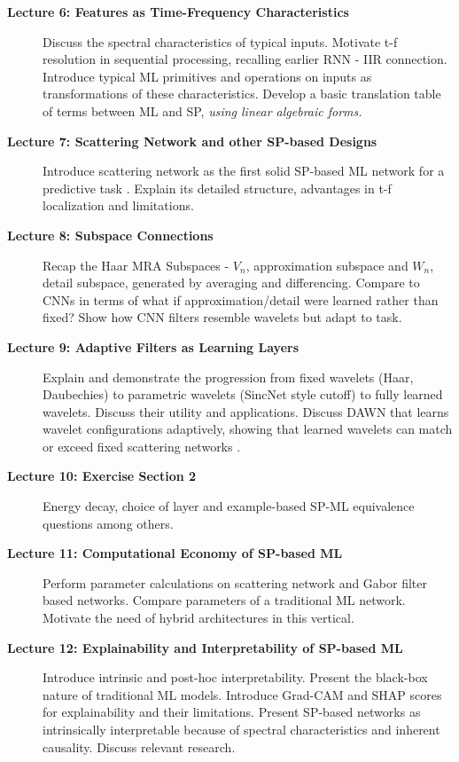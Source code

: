 \documentclass[12pt]{article}
\begin{document}
\begin{description}
    \item[\textbf{Lecture 6: Features as Time-Frequency Characteristics}] 
    Discuss the spectral characteristics of typical inputs. Motivate t-f resolution in sequential processing, recalling earlier RNN - IIR connection. Introduce typical ML primitives and operations on inputs as transformations of these characteristics. Develop a basic translation table of terms between ML and SP, \textit{using linear algebraic forms.}

    \item[\textbf{Lecture 7: Scattering Network and other SP-based Designs}]
    Introduce scattering network as the first solid SP-based ML network for a predictive task \cite{3}. Explain its detailed structure, advantages in t-f localization and limitations.

    \item[\textbf{Lecture 8: Subspace Connections}] 
    Recap the Haar MRA Subspaces - $V_n$, approximation subspace and $W_n$, detail subspace, generated by averaging and differencing. Compare to CNNs in terms of what if approximation/detail were learned rather than fixed? Show how CNN filters resemble wavelets but adapt to task. 

    \item[\textbf{Lecture 9: Adaptive Filters as Learning Layers}] 
    Explain and demonstrate the progression from fixed wavelets (Haar, Daubechies) to parametric wavelets (SincNet style cutoff) to fully learned wavelets. Discuss their utility and applications. Discuss DAWN \cite{4} that learns wavelet configurations adaptively, showing that learned wavelets can match or exceed fixed scattering networks \cite{5}.

    \item[\textbf{Lecture 10: Exercise Section 2}] 
    Energy decay, choice of layer and example-based SP-ML equivalence questions among others. 

    \item[\textbf{Lecture 11: Computational Economy of SP-based ML}] 
    Perform parameter calculations on scattering network and Gabor filter based networks. Compare parameters of a traditional ML network. Motivate the need of hybrid architectures in this vertical.

    \item[\textbf{Lecture 12: Explainability and Interpretability of SP-based ML}] 
    Introduce intrinsic and post-hoc interpretability. Present the black-box nature of traditional ML models. Introduce Grad-CAM and SHAP scores for explainability and their limitations. Present SP-based networks as intrinsically interpretable because of spectral characteristics and inherent causality. Discuss relevant research.


\end{description}
\end{document}
